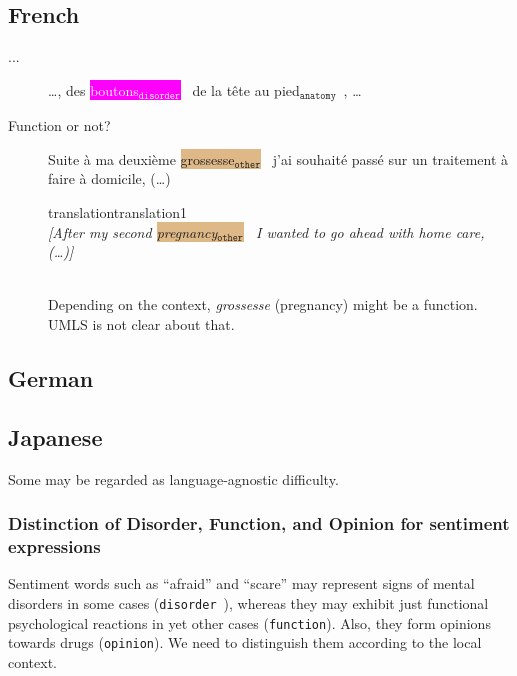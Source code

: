 \documentclass[12pt]{article}
\theoremstyle{definition}
\newcommand{\anatomy}[1]{\colorbox{dollarbill}{#1$_{\texttt{anatomy}}$}\ }
\newcommand{\disorder}[1]{\colorbox{fuchsia}{\textcolor{white}{#1$_{\texttt{disorder}}$}}\ }
\newcommand{\other}[1]{\colorbox{burlywood}{#1$_{\texttt{other}}$}\ }
\newcommand{\dis}{\texttt{disorder}\ }
\newcommand{\translation}[1]{\begin{ocg}{translation}{translation}{1}\footnotesize{\\\textit{[#1]}}\end{ocg}}
\begin{document}
\subsection{French}

\begin{description}
    \item[...] \ldots, des \disorder{boutons} \anatomy{de la tête au pied}, \ldots
    
    \item[Function or not?] Suite à ma deuxième \other{grossesse} j'ai souhaité passé sur un traitement à faire à domicile, (\ldots) \translation{After my second \other{pregnancy} I wanted to go ahead with home care, (\ldots)}\\
    Depending on the context, \textit{grossesse} (pregnancy) might be a function. UMLS is not clear about that.

\end{description}

\subsection{German}

\subsection{Japanese}

Some may be regarded as language-agnostic difficulty.

\subsubsection{Distinction of Disorder, Function, and Opinion for sentiment expressions}

Sentiment words such as ``afraid'' and ``scare'' may represent signs of mental disorders in some cases (\dis), whereas they may exhibit just functional psychological reactions in yet other cases (\texttt{function}).
Also, they form opinions towards drugs (\texttt{opinion}).
We need to distinguish them according to the local context.
\end{document}
